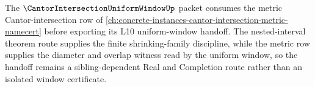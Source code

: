 The $\CantorIntersectionUniformWindowUp$ packet consumes the metric Cantor-intersection row of \autoref{ch:concrete-instances-cantor-intersection-metric-namecert} before exporting its L10 uniform-window handoff. The nested-interval theorem route supplies the finite shrinking-family discipline, while the metric row supplies the diameter and overlap witness read by the uniform window, so the handoff remains a sibling-dependent Real and Completion route rather than an isolated window certificate.

